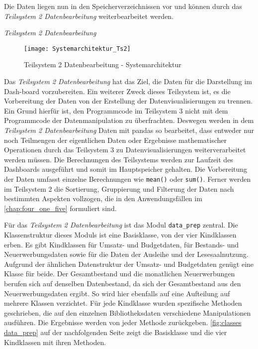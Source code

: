     Die Daten liegen nun in den Speicherverzeichnissen vor und können durch das \textit{Teilsystem 2 Datenbearbeitung} 
    weiterbearbeitet werden.
    
    \clearpage
    \noindent
    \textit{Teilsystem 2 Datenbearbeitung}

    \begin{figure}[H]
        \centering
            \texttt{[image: Systemarchitektur\_Ts2]}
            \caption{Teilsystem 2 Datenbearbeitung - Systemarchitektur}
            \label{fig:Systemarchitektur Teilsystem 2}
    \end{figure}

    Das \textit{Teilsystem 2 Datenbearbeitung} hat das Ziel, die Daten für die Darstellung im Dash-board vorzubereiten. Ein weiterer Zweck dieses
    Teilsystem ist, es die Vorbereitung der Daten von der Erstellung der Datenvisualisierungen zu trennen. Ein Grund hierfür
    ist, den Programmcode im Teilsystem 3 nicht mit dem Programmcode der Datenmanipulation zu überfrachten. 
    Deswegen werden in dem \textit{Teilsystem 2 Datenbearbeitung} Daten mit pandas so bearbeitet, 
    dass entweder nur noch Teilmengen der eigentlichen Daten oder Ergebnisse mathematischer Operationen durch das Teilsystem 3 
    zu Datenvisualisierungen weiterverarbeitet werden müssen. 
    Die Berechnungen des Teilsystems werden zur Laufzeit des Dashboards ausgeführt und somit im Hauptspeicher gehalten.
    Die Vorbereitung der Daten umfasst einzelne Berechnungen 
    wie \texttt{mean()} oder \texttt{sum()}. Ferner werden im Teilsystem 2 die Sortierung, Gruppierung und Filterung der 
    Daten nach bestimmten Aspekten vollzogen, die in den Anwendungsfällen im \autoref{chap:four_one_five} formuliert sind.
    
    Für das \textit{Teilsystem 2 Datenbearbeitung} ist das Modul \texttt{data\_prep} zentral. Die Klassenstruktur dieses Moduls ist eine 
    Basisklasse, von der vier Kindklassen erben. Es gibt Kindklassen für Umsatz- und Budgetdaten, für Bestands- und Neuerwerbungsdaten sowie für die Daten der Ausleihe und 
    der Lesesaalnutzung. Aufgrund der ähnlichen Datenstruktur der Umsatz- und Budgetdaten genügt eine Klasse für beide.
    Der Gesamtbestand und die monatlichen Neuerwerbungen berufen sich auf denselben Datenbestand, da sich der Gesamtbestand aus den  Neuerwerbungsdaten ergibt.
    So wird hier ebenfalls auf eine Aufteilung auf mehrere Klassen verzichtet.
    Für jede Kindklasse wurden spezifische Methoden geschrieben, die auf den einzelnen Bibliotheksdaten verschiedene Manipulationen ausführen.
    Die Ergebnisse werden von jeder Methode zurückgeben. \autoref{fig:classes data_prep} auf der nachfolgenden Seite zeigt die Basisklasse und die vier Kindklassen mit ihren Methoden.

